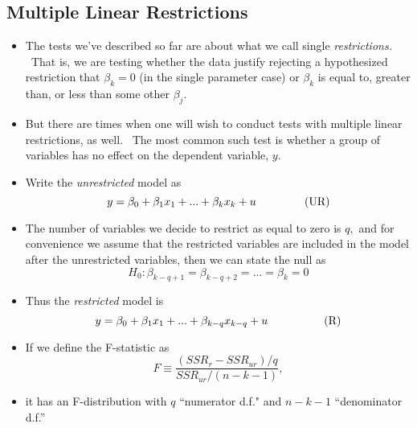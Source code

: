 \documentclass[11pt]{article}
\begin{document}
\subsection{Multiple Linear Restrictions}

\begin{itemize}
\item The tests we've described so far are about what we call single \textit{%
restrictions. \ }That is, we are testing whether the data justify rejecting
a hypothesized restriction that $\beta _{k}=0$ (in the single parameter
case) or $\beta _{k}$ is equal to, greater than, or less than some other $%
\beta _{j}.$

\item But there are times when one will wish to conduct tests with multiple
linear restrictions, as well. \ The most common such test is whether a group
of variables has no effect on the dependent variable, $y$.

\item Write the \textit{unrestricted} model as%
\begin{equation*}
y=\beta _{0}+\beta _{1}x_{1}+...+\beta _{k}x_{k}+u\text{ \ \ \ \ \ \ \ \ \ \
\ \ (UR)}
\end{equation*}

\item The number of variables we decide to restrict as equal to zero is $q,$
and for convenience we assume that the restricted variables are included in
the model after the unrestricted variables, then we can state the null as%
\begin{equation*}
H_{0}:\beta _{k-q+1}=\beta _{k-q+2}=...=\beta _{k}=0
\end{equation*}

\item Thus the \textit{restricted }model is%
\begin{equation*}
y=\beta _{0}+\beta _{1}x_{1}+...+\beta _{k-q}x_{k-q}+u\text{ \ \ \ \ \ \ \ \
\ \ \ \ \ \ (R)}
\end{equation*}

\item If we define the F-statistic as%
\begin{equation*}
F\equiv \frac{(SSR_{r}-SSR_{ur})/q}{SSR_{ur}/(n-k-1)},
\end{equation*}

\item it has an F-distribution with $q$ \textquotedblleft numerator d.f."
and $n-k-1$ \textquotedblleft denominator d.f.\textquotedblright


\end{itemize}
\end{document}
